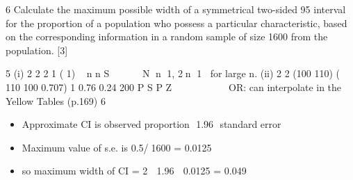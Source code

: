 \documentclass[a4paper,12pt]{article}
\begin{document}


\item 6 Calculate the maximum possible width of a symmetrical two-sided 95%
interval for the proportion of a population who possess a particular characteristic,
based on the corresponding information in a random sample of size 1600 from the
population. [3]


\newpage

5 (i)
2
2
2 1
( 1) ~ n
n S




 N n 1, 2n 1 for large n.
(ii)
2
2
(100 110) ( 110 100 0.707) 1 0.76 0.24
200
P S P Z 
      

OR: can interpolate in the Yellow Tables (p.169)
6 
\begin{itemize}
    \item Approximate CI is observed proportion  {1.96  standard error}
\item Maximum value of s.e. is 0.5/1600 = 0.0125
\item so maximum width of CI = 2  1.96  0.0125 = 0.049
\end{itemize}
\end{document}
